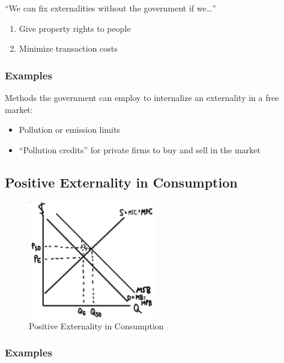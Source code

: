 \documentclass[
  letterpaper,
  DIV=11,
  numbers=noendperiod]{scrartcl}
\providecommand{\tightlist}{%
  \setlength{\itemsep}{0pt}\setlength{\parskip}{0pt}}\usepackage{longtable,booktabs,array}
\begin{document}
``We can fix externalities without the government if we\ldots{}''

\begin{enumerate}
\def\labelenumi{\arabic{enumi})}
\tightlist
\item
  Give property rights to people
\item
  Minimize transaction costs
\end{enumerate}

\subsubsection{Examples}\label{examples-1}

Methods the government can employ to internalize an externality in a
free market:

\begin{itemize}
\tightlist
\item
  Pollution or emission limits
\item
  ``Pollution credits'' for private firms to buy and sell in the market
\end{itemize}

\newpage{}

\subsection{Positive Externality in
Consumption}\label{positive-externality-in-consumption}

\begin{figure}[H]

{\centering \includegraphics[width=0.5\textwidth,height=\textheight]{img/pos-cons.png}

}

\caption{Positive Externality in Consumption}

\end{figure}%

\subsubsection{Examples}\label{examples-2}
\end{document}
